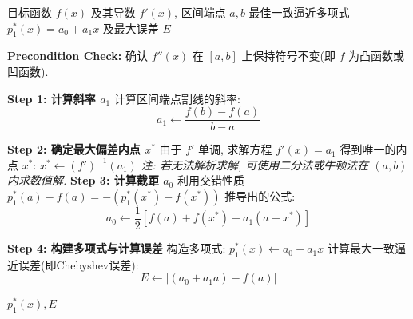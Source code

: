 \documentclass[UTF8, a4paper, 11pt]{ctexart}
\begin{document}
\begin{algorithm}[H]
    \caption{$n=1$时最佳一次一致逼近多项式构造算法}
    \label{alg:best_approx_deg1}
    \begin{algorithmic}[1]
    \REQUIRE 目标函数 $f(x)$ 及其导数 $f'(x)$, 区间端点 $a, b$
    \ENSURE 最佳一致逼近多项式 $p_1^*(x) = a_0 + a_1 x$ 及最大误差 $E$

    \STATE \textbf{Precondition Check:} 确认 $f''(x)$ 在 $[a, b]$ 上保持符号不变(即 $f$ 为凸函数或凹函数). 

    \STATE \textbf{Step 1: 计算斜率 $a_1$}
    \STATE 计算区间端点割线的斜率: 
    \[ a_1 \leftarrow \frac{f(b) - f(a)}{b - a} \]

    \STATE \textbf{Step 2: 确定最大偏差内点 $x^*$}
    \STATE 由于 $f'$ 单调, 求解方程 $f'(x) = a_1$ 得到唯一的内点 $x^*$: $x^* \leftarrow (f')^{-1}(a_1)$
    \STATE \textit{注: 若无法解析求解, 可使用二分法或牛顿法在 $(a, b)$ 内求数值解. }
    \STATE \textbf{Step 3: 计算截距 $a_0$}
    \STATE 利用交错性质 $p_1^*(a) - f(a) = -(p_1^*(x^*) - f(x^*))$ 推导出的公式: 
    \[ a_0 \leftarrow \frac{1}{2} \left[ f(a) + f(x^*) - a_1(a + x^*) \right] \]

    \STATE \textbf{Step 4: 构建多项式与计算误差}
    \STATE 构造多项式: $p_1^*(x) \leftarrow a_0 + a_1 x$
    \STATE 计算最大一致逼近误差(即Chebyshev误差): 
    \[ E \leftarrow | (a_0 + a_1 a) - f(a) | \]

    \RETURN $p_1^*(x), E$
\end{algorithmic}
\end{algorithm}
\end{document}

